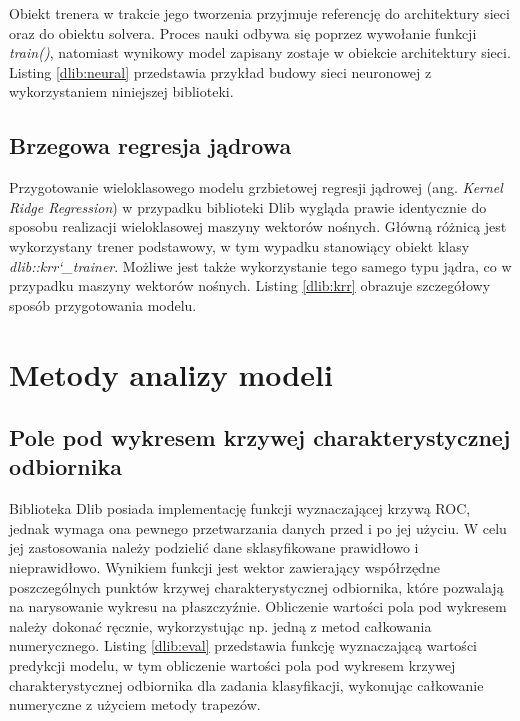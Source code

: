 Obiekt trenera w trakcie jego tworzenia przyjmuje referencję do architektury sieci oraz do obiektu solvera. Proces nauki odbywa się poprzez wywołanie funkcji \textit{train()}, natomiast wynikowy model zapisany zostaje w obiekcie architektury sieci. Listing \ref{dlib:neural} przedstawia przykład budowy sieci neuronowej z wykorzystaniem niniejszej biblioteki.


\subsection{Brzegowa regresja jądrowa}

Przygotowanie wieloklasowego modelu grzbietowej regresji jądrowej (ang. \textit{Kernel Ridge Regression}) w przypadku biblioteki Dlib wygląda prawie identycznie do sposobu realizacji wieloklasowej maszyny wektorów nośnych. Główną różnicą jest wykorzystany trener podstawowy, w tym wypadku stanowiący obiekt klasy \textit{dlib::krr\char`_trainer}. Możliwe jest także wykorzystanie tego samego typu jądra, co w przypadku maszyny wektorów nośnych. Listing \ref{dlib:krr} obrazuje szczegółowy sposób przygotowania modelu.


\section{Metody analizy modeli}

\subsection{Pole pod wykresem krzywej charakterystycznej odbiornika}

Biblioteka Dlib posiada implementację funkcji wyznaczającej krzywą ROC, jednak wymaga ona pewnego przetwarzania danych przed i po jej użyciu. W celu jej zastosowania należy podzielić dane sklasyfikowane prawidłowo i nieprawidłowo. Wynikiem funkcji jest wektor zawierający współrzędne poszczególnych punktów krzywej charakterystycznej odbiornika, które pozwalają na narysowanie wykresu na płaszczyźnie. Obliczenie wartości pola pod wykresem należy dokonać ręcznie, wykorzystując np. jedną z metod całkowania numerycznego. Listing \ref{dlib:eval} przedstawia funkcję wyznaczającą wartości predykcji modelu, w tym obliczenie wartości pola pod wykresem krzywej charakterystycznej odbiornika dla zadania klasyfikacji, wykonując całkowanie numeryczne z użyciem metody trapezów.

